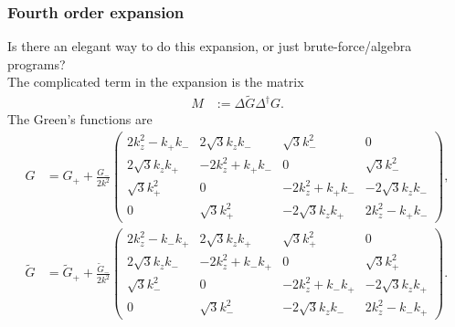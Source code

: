 \documentclass[english, parskip=full]{scrartcl}
\begin{document}
\subsubsection{Fourth order expansion}
\color{red}Is there an elegant way to do this expansion, or just brute-force/algebra programs?\color{black}\\
The complicated term in the expansion is the matrix
\begin{align}
M &:= \Delta \tilde{G} \Delta^\dagger G.
\end{align}
The Green's functions are
\begin{align}
G &= G_+ + \frac{G_-}{2k^2} \begin{pmatrix}
2k_z^2 -k_+k_- & 2\sqrt{3}k_zk_- & \sqrt{3}k_-^2 & 0\\
2\sqrt{3}k_zk_+ & -2k_z^2 + k_+k_- & 0 & \sqrt{3}k_-^2\\
\sqrt{3}k_+^2 & 0 & -2k_z^2 + k_+k_- & -2\sqrt{3}k_zk_-\\
0 & \sqrt{3}k_+^2 & -2\sqrt{3}k_zk_+ & 2k_z^2 -k_+k_-
\end{pmatrix},\\
\tilde{G} &= \tilde{G}_+ + \frac{\tilde{G}_-}{2k^2}\begin{pmatrix}
2k_z^2 -k_-k_+ & 2\sqrt{3}k_zk_+ & \sqrt{3}k_+^2 & 0\\
2\sqrt{3}k_zk_- & -2k_z^2 + k_-k_+ & 0 & \sqrt{3}k_+^2\\
\sqrt{3}k_-^2 & 0 & -2k_z^2 + k_-k_+ & -2\sqrt{3}k_zk_+\\
0 & \sqrt{3}k_-^2 & -2\sqrt{3}k_zk_- & 2k_z^2 -k_-k_+
\end{pmatrix}.
\end{align}
\end{document}
